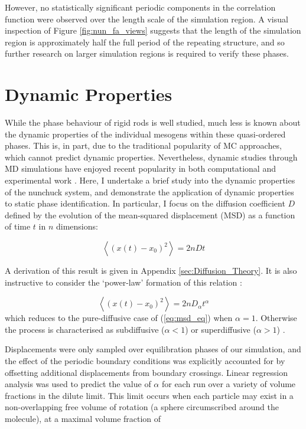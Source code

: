 \documentclass[11pt, a4paper]{article} %
\begin{document}
However, no statistically significant periodic components in the correlation function were observed over the length scale of the simulation region. A visual inspection of Figure \ref{fig:nun_fa_views} suggests that the length of the simulation region is approximately half the full period of the repeating structure, and so further research on larger simulation regions is required to verify these phases.




\section{Dynamic Properties} \label{sec:Dynamics}
While the phase behaviour of rigid rods is well studied, much less is known about the dynamic properties of the individual mesogens within these quasi-ordered phases. This is, in part, due to the traditional popularity of MC approaches, which cannot predict dynamic properties. Nevertheless, dynamic studies through MD simulations have enjoyed recent popularity in both computational and experimental work \cite{GayBalmaz2013, Zhao2013, Rey2013}. Here, I undertake a brief study into the dynamic properties of the nunchuck system, and demonstrate the application of dynamic properties to static phase identification. In particular, I focus on the diffusion coefficient $D$ defined by the evolution of the mean-squared displacement (MSD) as a function of time $t$ in $n$ dimensions:

\begin{equation} \label{eq:msd_eq} 
\left\langle \left(x(t) - x_{0}\right)^{2} \right\rangle = 2nDt
\end{equation}

A derivation of this result is given in Appendix \ref{sec:Diffusion_Theory}. It is also instructive to consider the `power-law' formation of this relation \cite{Ernst2013}: 

\begin{equation}
\left\langle \left(x(t) - x_{0}\right)^{2} \right\rangle = 2nD_{\alpha}t^{\alpha}
\end{equation} which reduces to the pure-diffusive case of (\ref{eq:msd_eq}) when $\alpha=1$. Otherwise the process is characterised as subdiffusive ($\alpha < 1$) or superdiffusive ($\alpha > 1$) \cite{Metzler2000}. 

Displacements were only sampled over equilibration phases of our simulation, and the effect of the periodic boundary conditions was explicitly accounted for by offsetting additional displacements from boundary crossings. Linear regression analysis was used to predict the value of $\alpha$ for each run over a variety of volume fractions in the dilute limit. This limit occurs when each particle may exist in a non-overlapping free volume of rotation (a sphere circumscribed around the molecule), at a maximal volume fraction of
\end{document}

